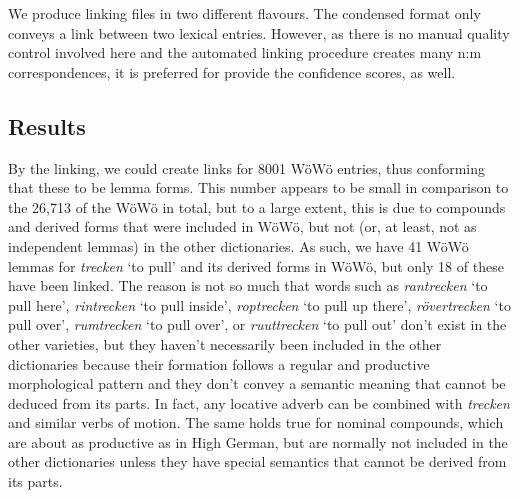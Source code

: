 \documentclass{article}
\newcommand{\word}[1]{\textsl{#1}}
\begin{document}
We produce linking files in two different flavours. The condensed format only conveys a  link between two lexical entries. 
However, as there is no manual quality control involved here and the automated linking procedure creates many n:m correspondences, it is preferred for provide the confidence scores, as well. 








\subsection{Results}

By the linking, we could create links for 8001 WöWö entries, thus conforming that these to be lemma forms. This number appears to be small in comparison to the 26,713 of the WöWö in total, but to a large extent, this is due to compounds and derived forms that were included in WöWö, but not (or, at least, not as independent lemmas) in the other dictionaries. As such, we have 41 WöWö lemmas for \word{trecken} `to pull' and its derived forms in WöWö, but only 18 of these have been linked. The reason is not so much that words such as \word{rantrecken} `to pull here', \word{rintrecken} `to pull inside', \word{roptrecken} `to pull up there', \word{rövertrecken} `to pull over', \word{rumtrecken} `to pull over', or \word{ruuttrecken} `to pull out' don't exist in the other varieties, but they haven't necessarily been included in the other dictionaries because their formation follows a regular and productive morphological pattern and they don't convey a semantic meaning that cannot be deduced from its parts. In fact, any locative adverb can be combined with \word{trecken} and similar verbs of motion. The same holds true for nominal compounds, which are about as productive as in High German, but are normally not included in the other dictionaries unless they have special semantics that cannot be derived from its parts.
\end{document}
